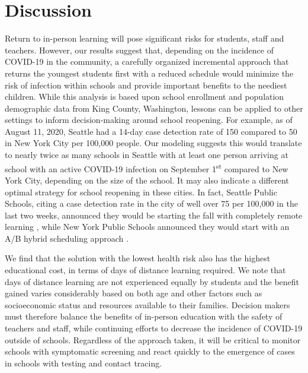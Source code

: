 \documentclass[preprint,12pt]{elsarticle}
\begin{document}
\section{Discussion}

Return to in-person learning will pose significant risks for students, staff and teachers. However, our results suggest that, depending on the incidence of COVID-19 in the community, a carefully organized incremental approach that returns the youngest students first with a reduced schedule would minimize the risk of infection within schools and provide important benefits to the neediest children. While this analysis is based upon school enrollment and population demographic data from King County, Washington, lessons can be applied to other settings to inform decision-making around school reopening. For example, as of August 11, 2020, Seattle had a 14-day case detection rate of 150 compared to 50 in New York City per 100,000 people. Our modeling suggests this would translate to nearly twice as many schools in Seattle with at least one person arriving at school with an active COVID-19 infection on September 1\textsuperscript{st} compared to New York City, depending on the size of the school. It may also indicate a different optimal strategy for school reopening in these cities. In fact, Seattle Public Schools, citing a case detection rate in the city of well over 75 per 100,000 in the last two weeks, announced they would be starting the fall with completely remote learning \cite{staff_seattle_2020}, while New York Public Schools announced they would start with an A/B hybrid scheduling approach \cite{zaveri_new_2020}.

We find that the solution with the lowest health risk also has the highest educational cost, in terms of days of distance learning required. We note that days of distance learning are not experienced equally by students and the benefit gained varies considerably based on both age and other factors such as socioeconomic status and resources available to their families. Decision makers must therefore balance the benefits of in-person education with the safety of teachers and staff, while continuing efforts to decrease the incidence of COVID-19 outside of schools. Regardless of the approach taken, it will be critical to monitor schools with symptomatic screening and react quickly to the emergence of cases in schools with testing and contact tracing.
\end{document}
